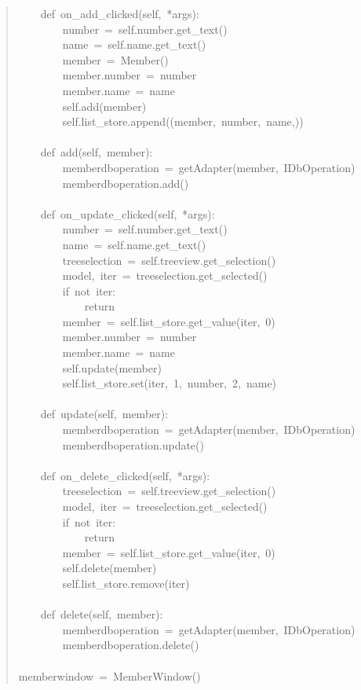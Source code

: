 \documentclass[a4paper,openany,twoside,final]{book}
\begin{document}
\begin{quote}
{~~~~def~on\_add\_clicked(self,~*args):\\
~~~~~~~~number~=~self.number.get\_text()\\
~~~~~~~~name~=~self.name.get\_text()\\
~~~~~~~~member~=~Member()\\
~~~~~~~~member.number~=~number\\
~~~~~~~~member.name~=~name\\
~~~~~~~~self.add(member)\\
~~~~~~~~self.list\_store.append((member,~number,~name,))\\
~\\
~~~~def~add(self,~member):\\
~~~~~~~~memberdboperation~=~getAdapter(member,~IDbOperation)\\
~~~~~~~~memberdboperation.add()\\
~\\
~~~~def~on\_update\_clicked(self,~*args):\\
~~~~~~~~number~=~self.number.get\_text()\\
~~~~~~~~name~=~self.name.get\_text()\\
~~~~~~~~treeselection~=~self.treeview.get\_selection()\\
~~~~~~~~model,~iter~=~treeselection.get\_selected()\\
~~~~~~~~if~not~iter:\\
~~~~~~~~~~~~return\\
~~~~~~~~member~=~self.list\_store.get\_value(iter,~0)\\
~~~~~~~~member.number~=~number\\
~~~~~~~~member.name~=~name\\
~~~~~~~~self.update(member)\\
~~~~~~~~self.list\_store.set(iter,~1,~number,~2,~name)\\
~\\
~~~~def~update(self,~member):\\
~~~~~~~~memberdboperation~=~getAdapter(member,~IDbOperation)\\
~~~~~~~~memberdboperation.update()\\
~\\
~~~~def~on\_delete\_clicked(self,~*args):\\
~~~~~~~~treeselection~=~self.treeview.get\_selection()\\
~~~~~~~~model,~iter~=~treeselection.get\_selected()\\
~~~~~~~~if~not~iter:\\
~~~~~~~~~~~~return\\
~~~~~~~~member~=~self.list\_store.get\_value(iter,~0)\\
~~~~~~~~self.delete(member)\\
~~~~~~~~self.list\_store.remove(iter)\\
~\\
~~~~def~delete(self,~member):\\
~~~~~~~~memberdboperation~=~getAdapter(member,~IDbOperation)\\
~~~~~~~~memberdboperation.delete()\\
~\\
memberwindow~=~MemberWindow()
}
\end{quote}
\end{document}

